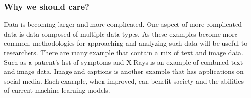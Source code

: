 \subsubsection{Why we should care?}

Data is becoming larger and more complicated.  One aspect of more complicated data is data composed of multiple data types. As these examples become more common, methodologies for approaching and analyzing such data will be useful to researchers.  There are many example that contain a mix of text and image data.  Such as a patient's list of symptoms and X-Rays is an example of combined text and image data.  Image and captions is another example that has applications on social media. Each example, when improved, can benefit society and the abilities of current machine learning models. 

